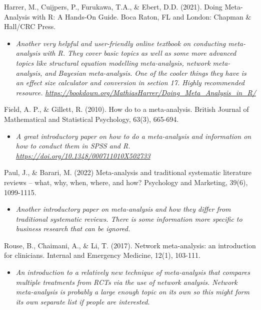 \documentclass[
]{book}
\providecommand{\tightlist}{%
  \setlength{\itemsep}{0pt}\setlength{\parskip}{0pt}}
\begin{document}
Harrer, M., Cuijpers, P., Furukawa, T.A., \& Ebert, D.D. (2021). Doing Meta-Analysis with R: A Hands-On Guide. Boca Raton, FL and London: Chapman \& Hall/CRC Press.

\begin{itemize}
\tightlist
\item
  \emph{Another very helpful and user-friendly online textbook on conducting meta-analysis with R. They cover basic topics as well as some more advanced topics like structural equation modelling meta-analysis, network meta-analysis, and Bayesian meta-analysis. One of the cooler things they have is an effect size calculator and conversion in section 17. Highly recommended resource. \url{https://bookdown.org/MathiasHarrer/Doing_Meta_Analysis_in_R/} }
\end{itemize}

Field, A. P., \& Gillett, R. (2010). How do to a meta-analysis. British Journal of Mathematical and Statistical Psychology, 63(3), 665-694.

\begin{itemize}
\tightlist
\item
  \emph{A great introductory paper on how to do a meta-analysis and information on how to conduct them in SPSS and R. \url{https://doi.org/10.1348/000711010X502733} }
\end{itemize}

Paul, J., \& Barari, M. (2022) Meta-analysis and traditional systematic literature reviews -- what, why, when, where, and how? Psychology and Marketing, 39(6), 1099-1115.

\begin{itemize}
\tightlist
\item
  \emph{Another introductory paper on meta-analysis and how they differ from traditional systematic reviews. There is some information more specific to business research that can be ignored. }
\end{itemize}

Rouse, B., Chaimani, A., \& Li, T. (2017). Network meta-analysis: an introduction for clinicians. Internal and Emergency Medicine, 12(1), 103-111.

\begin{itemize}
\tightlist
\item
  \emph{An introduction to a relatively new technique of meta-analysis that compares multiple treatments from RCTs via the use of network analysis. Network meta-analysis is probably a large enough topic on its own so this might form its own separate list if people are interested.}
\end{itemize}
\end{document}
